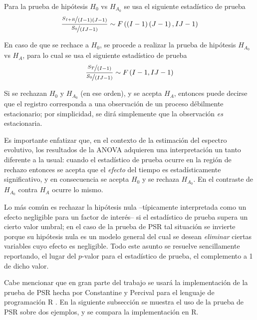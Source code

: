 \documentclass[12pt,letterpaper]{book}
\begin{document}
Para la prueba de hipótesis $H_0$ vs $H_{A_0}$ se usa el siguiente estadístico de prueba
\begin{equation}
\frac{\nicefrac{S_{I+R}}{(I-1)(J-1)}}{\nicefrac{S_0}{(IJ-1)}}
\sim F \left(\left(I-1 \right)\left(J-1 \right) , IJ-1 \right)
\end{equation}

En caso de que se rechace a $H_0$, se procede a realizar la prueba de hipótesis $H_{A_0}$ vs $H_{A}$, para lo cual se usa el siguiente estadístico de prueba
\begin{equation}
\frac{\nicefrac{S_{T}}{(I-1)}}{\nicefrac{S_0}{(IJ-1)}}
\sim F \left( I-1  , IJ-1 \right)
\end{equation}

Si se rechazan $H_0$ y $H_{A_0}$ (en ese orden), y se acepta $H_A$, entonces puede decirse que el registro corresponda a una observación de un proceso débilmente estacionario; por simplicidad, se dirá simplemente que la observación \textit{es} estacionaria.

Es importante enfatizar que, en el contexto de la estimación del espectro evolutivo, los resultados de la ANOVA adquieren una interpretación un tanto diferente a la usual: cuando el estadístico de prueba ocurre en la región de rechazo entonces se acepta que el \textit{efecto} del tiempo es estadísticamente significativo, y en consecuencia se acepta $H_0$ y se rechaza $H_{A_0}$. 
%
En el contraste de $H_{A_0}$ contra $H_A$ ocurre lo mismo.

Lo más común es rechazar la hipótesis nula --típicamente interpretada como un efecto negligible para un factor de interés-- si el estadístico de prueba supera un cierto valor umbral; en el caso de la prueba de PSR tal situación se invierte porque su hipótesis nula es un modelo general del cual se desean \textit{eliminar} ciertas variables cuyo efecto es negligible.
%
Todo este asunto se resuelve sencillamente reportando, el lugar del $p$-valor para el estadístico de prueba, el complemento a 1 de dicho valor.

Cabe mencionar que en gran parte del trabajo se usará la implementación de la prueba de PSR hecha por Constantine y Percival para el lenguaje de programación R \cite{R_fractal}.
%
En la siguiente subsección se muestra el uso de la prueba de PSR sobre dos ejemplos, y se compara la implementación en R.

\end{document}
